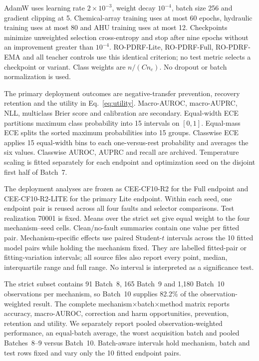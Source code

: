 \documentclass[11pt]{article}
\begin{document}
AdamW uses learning rate $2\times10^{-3}$, weight decay $10^{-4}$, batch size 256 and gradient clipping at 5. Chemical-array training uses at most 60 epochs, hydraulic training uses at most 80 and AHU training uses at most 12. Checkpoints minimize unweighted selection cross-entropy and stop after nine epochs without an improvement greater than $10^{-4}$. RO-PDRF-Lite, RO-PDRF-Full, RO-PDRF-EMA and all teacher controls use this identical criterion; no test metric selects a checkpoint or variant. Class weights are $n/(Cn_c)$. No dropout or batch normalization is used.

The primary deployment outcomes are negative-transfer prevention, recovery retention and the utility in Eq.~\eqref{eq:utility}. Macro-AUROC, macro-AUPRC, NLL, multiclass Brier score and calibration are secondary. Equal-width ECE partitions maximum class probability into 15 intervals on $[0,1]$. Equal-mass ECE splits the sorted maximum probabilities into 15 groups. Classwise ECE applies 15 equal-width bins to each one-versus-rest probability and averages the six values. Classwise AUROC, AUPRC and recall are archived. Temperature scaling is fitted separately for each endpoint and optimization seed on the disjoint first half of Batch~7.

The deployment analyses are frozen as CEE-CF10-R2 for the Full endpoint and CEE-CF10-R2-LITE for the primary Lite endpoint. Within each seed, one endpoint pair is reused across all four faults and selector comparisons. Test realization 70001 is fixed. Means over the strict set give equal weight to the four mechanism--seed cells. Clean/no-fault summaries contain one value per fitted pair. Mechanism-specific effects use paired Student-$t$ intervals across the 10 fitted model pairs while holding the mechanism fixed. They are labelled fitted-pair or fitting-variation intervals; all source files also report every point, median, interquartile range and full range. No interval is interpreted as a significance test.

The strict subset contains 91 Batch~8, 165 Batch~9 and 1,180 Batch~10 observations per mechanism, so Batch~10 supplies 82.2\% of the observation-weighted result. The complete mechanism$\times$batch$\times$method matrix reports accuracy, macro-AUROC, correction and harm opportunities, prevention, retention and utility. We separately report pooled observation-weighted performance, an equal-batch average, the worst acquisition batch and pooled Batches~8--9 versus Batch~10. Batch-aware intervals hold mechanism, batch and test rows fixed and vary only the 10 fitted endpoint pairs.
\end{document}
